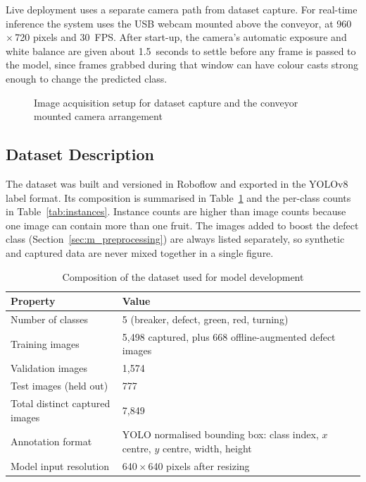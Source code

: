 Live deployment uses a separate camera path from dataset capture. For real-time inference the system uses the \acrshort{USB} webcam mounted above the conveyor, at 960\,$\times$\,720 pixels and 30~\acrshort{FPS}. After start-up, the camera's automatic exposure and white balance are given about 1.5~seconds to settle before any frame is passed to the model, since frames grabbed during that window can have colour casts strong enough to change the predicted class.


\begin{figure}[H]
\centering
{}
\caption{Image acquisition setup for dataset capture and the conveyor mounted camera arrangement}
\label{fig:acquisition}
\end{figure}

\subsection{Dataset Description}
\label{sec:m_dataset}

The dataset was built and versioned in Roboflow \citep{dwyer2024} and exported in the YOLOv8 label format. Its composition is summarised in Table~\ref{tab:dataset} and the per-class counts in Table~\ref{tab:instances}. Instance counts are higher than image counts because one image can contain more than one fruit. The images added to boost the defect class (Section~\ref{sec:m_preprocessing}) are always listed separately, so synthetic and captured data are never mixed together in a single figure.

\begin{table}[H]
\caption{Composition of the dataset used for model development}
\label{tab:dataset}
\centering
\begin{tabularx}{\textwidth}{p{6.2cm} X}
\toprule
\textbf{Property} & \textbf{Value} \\
\midrule
Number of classes & 5 (breaker, defect, green, red, turning) \\
Training images & 5{,}498 captured, plus 668 offline-augmented defect images \\
Validation images & 1{,}574 \\
Test images (held out) & 777 \\
Total distinct captured images & 7{,}849 \\
Annotation format & YOLO normalised bounding box: class index, $x$ centre, $y$ centre, width, height \\
Model input resolution & 640\,$\times$\,640 pixels after resizing \\
\bottomrule
\end{tabularx}
\end{table}

